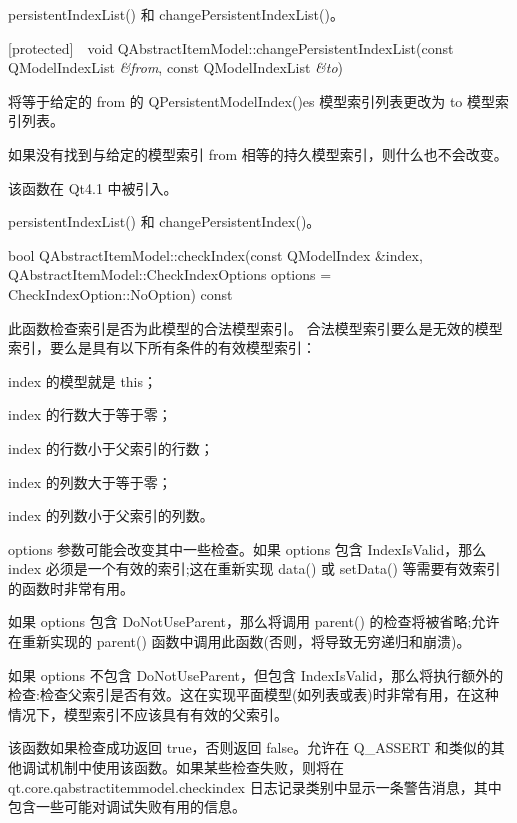 \begin{seeAlso}
persistentIndexList() 和 changePersistentIndexList()。
\end{seeAlso}

[protected] void QAbstractItemModel::changePersistentIndexList(const QModelIndexList \emph{\&from}, const QModelIndexList \emph{\&to})

将等于给定的 from 的 QPersistentModelIndex()es 模型索引列表更改为 to 模型索引列表。

如果没有找到与给定的模型索引 from 相等的持久模型索引，则什么也不会改变。

该函数在 Qt4.1 中被引入。

\begin{seeAlso}
persistentIndexList() 和 changePersistentIndex()。
\end{seeAlso}
  
bool QAbstractItemModel::checkIndex(const QModelIndex \&index, QAbstractItemModel::CheckIndexOptions options = CheckIndexOption::NoOption) const

此函数检查索引是否为此模型的合法模型索引。 合法模型索引要么是无效的模型索引，要么是具有以下所有条件的有效模型索引：

\begin{compactitem}
\item index 的模型就是 this；
\item index 的行数大于等于零；
\item index 的行数小于父索引的行数；
\item index 的列数大于等于零；
\item index 的列数小于父索引的列数。
\end{compactitem}

options 参数可能会改变其中一些检查。如果 options 包含 IndexIsValid，那么 index 必须是一个有效的索引;这在重新实现 data() 或 setData() 等需要有效索引的函数时非常有用。

如果 options 包含 DoNotUseParent，那么将调用 parent() 的检查将被省略;允许在重新实现的 parent() 函数中调用此函数(否则，将导致无穷递归和崩溃)。

如果 options 不包含 DoNotUseParent，但包含 IndexIsValid，那么将执行额外的检查:检查父索引是否有效。这在实现平面模型(如列表或表)时非常有用，在这种情况下，模型索引不应该具有有效的父索引。

该函数如果检查成功返回 true，否则返回 false。允许在 Q\_ASSERT 和类似的其他调试机制中使用该函数。如果某些检查失败，则将在 qt.core.qabstractitemmodel.checkindex 日志记录类别中显示一条警告消息，其中包含一些可能对调试失败有用的信息。

